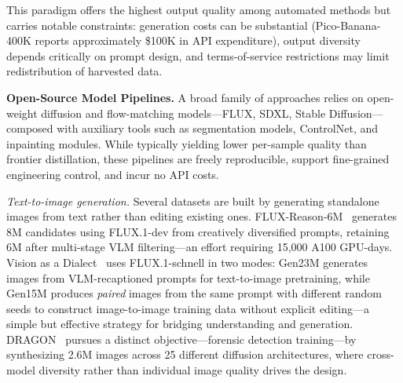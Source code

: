 This paradigm offers the highest output quality among automated methods but carries notable constraints: generation costs can be substantial (Pico-Banana-400K reports approximately \$100K in API expenditure), output diversity depends critically on prompt design, and terms-of-service restrictions may limit redistribution of harvested data.

\textbf{Open-Source Model Pipelines.}
A broad family of approaches relies on open-weight diffusion and flow-matching models---FLUX, SDXL, Stable Diffusion---composed with auxiliary tools such as segmentation models, ControlNet, and inpainting modules. While typically yielding lower per-sample quality than frontier distillation, these pipelines are freely reproducible, support fine-grained engineering control, and incur no API costs.

\emph{Text-to-image generation.}
Several datasets are built by generating standalone images from text rather than editing existing ones. FLUX-Reason-6M~\citep{fang2025flux} generates 8M candidates using FLUX.1-dev from creatively diversified prompts, retaining 6M after multi-stage VLM filtering---an effort requiring 15,000 A100 GPU-days. Vision as a Dialect~\citep{han2025vision} uses FLUX.1-schnell in two modes: Gen23M generates images from VLM-recaptioned prompts for text-to-image pretraining, while Gen15M produces \emph{paired} images from the same prompt with different random seeds to construct image-to-image training data without explicit editing---a simple but effective strategy for bridging understanding and generation. DRAGON~\citep{bertazzini2025dragon} pursues a distinct objective---forensic detection training---by synthesizing 2.6M images across 25 different diffusion architectures, where cross-model diversity rather than individual image quality drives the design.

